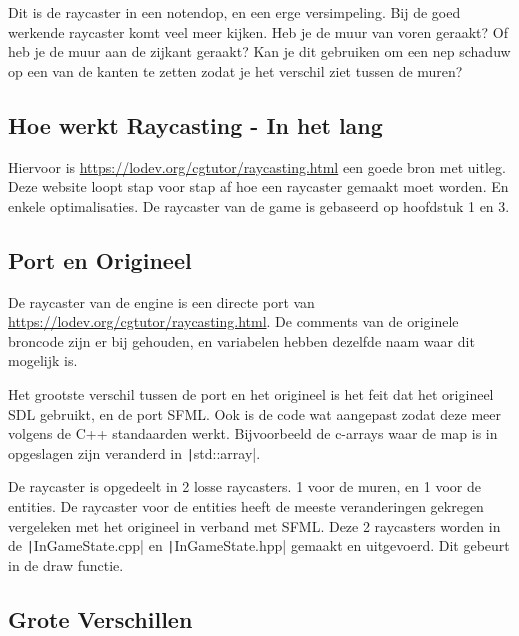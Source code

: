\documentclass{report}
\begin{document}
    Dit is de raycaster in een notendop, en een erge versimpeling. Bij de goed werkende raycaster komt veel meer kijken. Heb je de muur van voren geraakt? Of heb je de muur aan de zijkant geraakt? Kan je dit gebruiken om een nep schaduw op een van de kanten te zetten zodat je het verschil ziet tussen de muren?

    \subsection{Hoe werkt Raycasting - In het lang} %
    \label{sub:hoe_werkt_raycasting_in_het_lang}
    Hiervoor is \url{https://lodev.org/cgtutor/raycasting.html} een goede bron met uitleg. Deze website loopt stap voor stap af hoe een raycaster gemaakt moet worden. En enkele optimalisaties. De raycaster van de game is gebaseerd op hoofdstuk 1 en 3.

    \subsection{Port en Origineel} %
    \label{sub:port_en_origineel}
    De raycaster van de engine is een directe port van \url{https://lodev.org/cgtutor/raycasting.html}. De comments van de originele broncode zijn er bij gehouden, en variabelen hebben dezelfde naam waar dit mogelijk is.

    Het grootste verschil tussen de port en het origineel is het feit dat het origineel SDL gebruikt, en de port SFML. Ook is de code wat aangepast zodat deze meer volgens de C++ standaarden werkt. Bijvoorbeeld de c-arrays waar de map is in opgeslagen zijn veranderd in \texttt|std::array|.

    De raycaster is opgedeelt in 2 losse raycasters. 1 voor de muren, en 1 voor de entities.
    De raycaster voor de entities heeft de meeste veranderingen gekregen vergeleken met het origineel in verband met SFML. Deze 2 raycasters worden in de \texttt|InGameState.cpp| en \texttt|InGameState.hpp| gemaakt en uitgevoerd. Dit gebeurt in de draw functie.

    \subsection{Grote Verschillen} %
    \label{sub:grote_verschillen}
\end{document}
